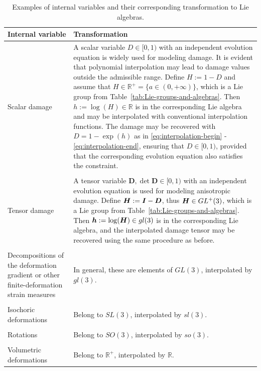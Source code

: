 \documentclass[12pt]{article}
\newcommand{\mbs}[1]{\boldsymbol{#1}}
\newcommand{\mbb}[1]{\mathbb{#1}}
\def\bD{{\mbs{D}}} \def\bE{{\mbs{E}}} \def\bF{{\mbs{F}}}
\begin{document}
\begin{table}[htbp]
  \begin{center}
    \begin{tabular}{ p{64mm} p{88mm} }
      \toprule
      Internal variable
      &
      Transformation
      \\
      \hline
      Scalar damage
      &
      A scalar variable $D \in [0,1)$ with an
      independent evolution equation is widely used for modeling damage.
      It is evident that polynomial interpolation may lead to damage
      values outside the admissible range. Define $H := 1 - D$ and assume
      that $H \in \mbb{R}^+ = \{ a \in (0,+\infty) \}$, which is a Lie
      group from Table~\ref{tab:Lie-groups-and-algebras}. Then $h := \log(H)
      \in \mbb{R}$ is in the corresponding Lie algebra and may be
      interpolated with conventional interpolation functions. The damage
      may be recovered with $D = 1 - \exp(h)$ as in
      \eqref{eq:interpolation-begin} - \eqref{eq:interpolation-end},
      ensuring that $D \in [0,1)$, provided that the corresponding
      evolution equation also satisfies the constraint.
      \\
      \\
      Tensor damage
      &
      A tensor variable $\bD, \det\bD \in [0,1)$
      with an independent evolution equation is used for modeling
      anisotropic damage. Define $\bH := \bI - \bD$, thus $\bH \in
      GL^+(3)$, which is a Lie group from
      Table~\ref{tab:Lie-groups-and-algebras}. Then $\bh := \log(\bH) \in
      gl(3)$ is in the corresponding Lie algebra, and the interpolated
      damage tensor may be recovered using the same procedure as before.
      \\
      \\
      Decompositions of the deformation gradient or other
      finite-deformation strain measures
      &      
      In general, these are
      elements of $GL(3)$, interpolated by $gl(3)$.
      \\
      \\
      Isochoric deformations
      &
      Belong to $SL(3)$, interpolated by
      $sl(3)$.
      \\
      \\
      Rotations
      &
      Belong to $SO(3)$, interpolated by $so(3)$.
      \\
      \\
      Volumetric deformations
      &
      Belong to $\mbb{R}^+$, interpolated by
      $\mbb{R}$.
      \\
      \bottomrule
    \end{tabular}
    \caption{Examples of internal variables and their corresponding
      transformation to Lie algebras.}
    \label{tab:examples-IV}
  \end{center}
\end{table}
\end{document}
